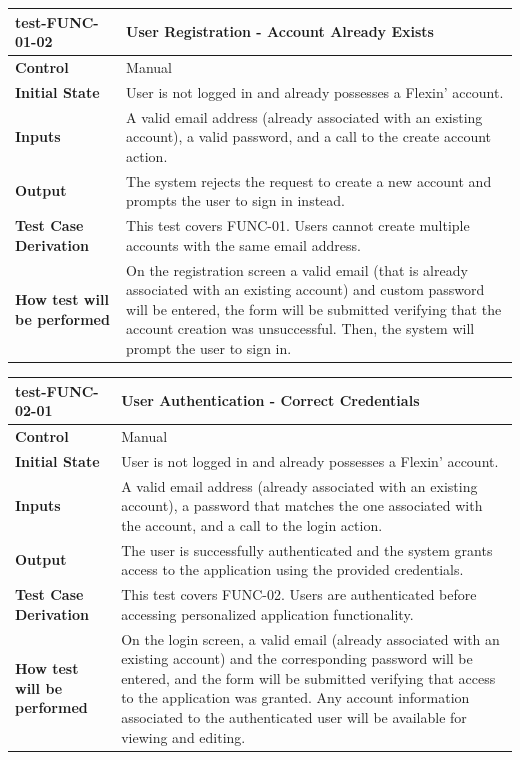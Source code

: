 \documentclass[12pt, titlepage]{article}
\begin{document}
\vspace{1em}

\noindent\begin{tabularx}{\textwidth}{>{\raggedright\arraybackslash}p{3.5cm}X}
  \toprule
  \textbf{test-FUNC-01-02} & \textbf{User Registration - Account Already Exists}\\
  \midrule
  \textbf{Control} & Manual\\
  \textbf{Initial State} & User is not logged in and already possesses a Flexin' account.\\
  \textbf{Inputs} & A valid email address (already associated with an existing account), a valid password, and a call to the create account action.\\
  \textbf{Output} & The system rejects the request to create a new account and prompts the user to sign in instead.\\
  \textbf{Test Case Derivation} & This test covers FUNC-01. Users cannot create multiple accounts with the same email address.\\
  \textbf{How test will be performed} & On the registration screen a valid email (that is already associated with an existing account) and custom password will be entered, the form will be submitted verifying that the account creation was unsuccessful. Then, the system will prompt the user to sign in.\\
  \bottomrule
\end{tabularx}

\vspace{1em}

\noindent\begin{tabularx}{\textwidth}{>{\raggedright\arraybackslash}p{3.5cm}X}
  \toprule
  \textbf{test-FUNC-02-01} & \textbf{User Authentication - Correct Credentials}\\
  \midrule
  \textbf{Control} & Manual\\
  \textbf{Initial State} & User is not logged in and already possesses a Flexin' account.\\
  \textbf{Inputs} & A valid email address (already associated with an existing account), a password that matches the one associated with the account, and a call to the login action.\\
  \textbf{Output} & The user is successfully authenticated and the system grants access to the application using the provided credentials.\\
  \textbf{Test Case Derivation} & This test covers FUNC-02. Users are authenticated before accessing personalized application functionality.\\
  \textbf{How test will be performed} & On the login screen, a valid email (already associated with an existing account) and the corresponding password will be entered, and the form will be submitted verifying that access to the application was granted. Any account information associated to the authenticated user will be available for viewing and editing.\\
  \bottomrule
\end{tabularx}
\end{document}
